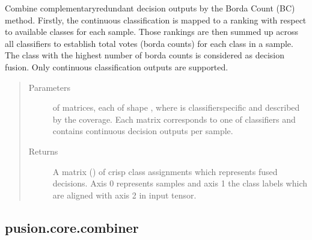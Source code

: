 \documentclass[letterpaper,10pt,english]{sphinxmanual}
\begin{document}
\begin{fulllineitems}
\begin{fulllineitems}
\label{\detokenize{pusion.core.borda_count_combiner:pusion.core.borda_count_combiner.CRBordaCountCombiner.combine}}
\sphinxAtStartPar
Combine complementary\sphinxhyphen{}redundant decision outputs by the Borda Count (BC) method. Firstly, the continuous
classification is mapped to a ranking with respect to available classes for each sample. Those rankings are then
summed up across all classifiers to establish total votes (borda counts) for each class in a sample. The class
with the highest number of borda counts is considered as decision fusion. Only continuous classification outputs
are supported.
\begin{quote}\begin{description}
\item[{Parameters}] \leavevmode
\sphinxAtStartPar
{} \textendash{}  of  matrices, each of shape ,
where  is classifier\sphinxhyphen{}specific and described by the coverage.
Each matrix corresponds to one of  classifiers and contains continuous decision outputs
per sample.

\item[{Returns}] \leavevmode
\sphinxAtStartPar
A matrix () of crisp class assignments which represents fused decisions.
Axis 0 represents samples and axis 1 the class labels which are aligned with axis 2 in
 input tensor.

\end{description}\end{quote}

\end{fulllineitems}


\end{fulllineitems}



\subsection{pusion.core.combiner}
\label{\detokenize{pusion.core.combiner:module-pusion.core.combiner}}\label{\detokenize{pusion.core.combiner:pusion-core-combiner}}\label{\detokenize{pusion.core.combiner::doc}}
\end{document}
